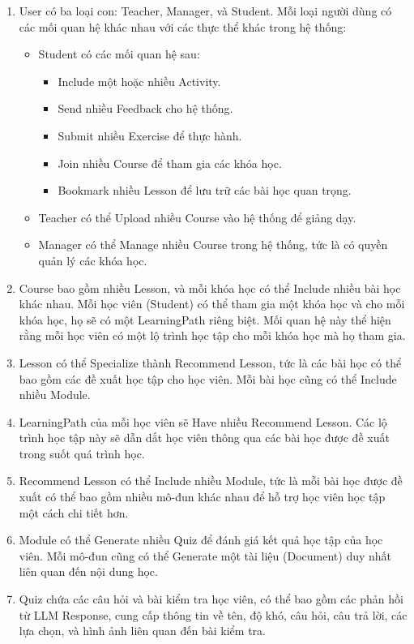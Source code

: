 \begin{enumerate}

    \item User có ba loại con: Teacher, Manager, và Student. Mỗi loại người dùng có các mối quan hệ khác nhau với các thực thể khác trong hệ thống:
    \begin{itemize}
        \item Student có các mối quan hệ sau:
        \begin{itemize}
            \item Include một hoặc nhiều Activity.
            \item Send nhiều Feedback cho hệ thống.
            \item Submit nhiều Exercise để thực hành.
            \item Join nhiều Course để tham gia các khóa học.
            \item Bookmark nhiều Lesson để lưu trữ các bài học quan trọng.
        \end{itemize}
        \item Teacher có thể Upload nhiều Course vào hệ thống để giảng dạy.
        \item Manager có thể Manage nhiều Course trong hệ thống, tức là có quyền quản lý các khóa học.
    \end{itemize}
    \item Course bao gồm nhiều Lesson, và mỗi khóa học có thể Include nhiều bài học khác nhau. Mỗi học viên (Student) có thể tham gia một khóa học và cho mỗi khóa học, họ sẽ có một LearningPath riêng biệt. Mối quan hệ này thể hiện rằng mỗi học viên có một lộ trình học tập cho mỗi khóa học mà họ tham gia.
    \item Lesson có thể Specialize thành Recommend Lesson, tức là các bài học có thể bao gồm các đề xuất học tập cho học viên. Mỗi bài học cũng có thể Include nhiều Module.
    \item LearningPath của mỗi học viên sẽ Have nhiều Recommend Lesson. Các lộ trình học tập này sẽ dẫn dắt học viên thông qua các bài học được đề xuất trong suốt quá trình học.
    \item Recommend Lesson có thể Include nhiều Module, tức là mỗi bài học được đề xuất có thể bao gồm nhiều mô-đun khác nhau để hỗ trợ học viên học tập một cách chi tiết hơn.
    \item Module có thể Generate nhiều Quiz để đánh giá kết quả học tập của học viên. Mỗi mô-đun cũng có thể Generate một tài liệu (Document) duy nhất liên quan đến nội dung học.
    \item Quiz chứa các câu hỏi và bài kiểm tra học viên, có thể bao gồm các phản hồi từ LLM Response, cung cấp thông tin về tên, độ khó, câu hỏi, câu trả lời, các lựa chọn, và hình ảnh liên quan đến bài kiểm tra.

\end{enumerate}
